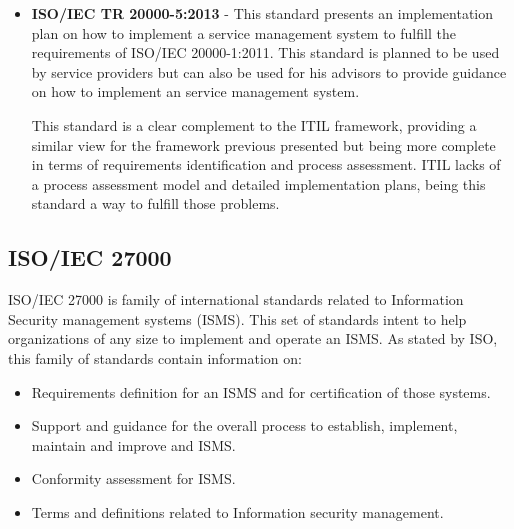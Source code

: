 \begin{itemize}
  \vspace{5mm}
  
  \item \textbf{ISO/IEC TR 20000-5:2013} - This standard presents an implementation plan on how to implement a service management system to fulfill the requirements of ISO/IEC 20000-1:2011. This standard is planned to be used by service providers but can also be used for his advisors to provide guidance on how to implement an service management system.\cite{ISO20000-5}\par
  
  \vspace{5mm}

  This standard is a clear complement to the ITIL framework, providing a similar view for the framework previous presented but being more complete in terms of requirements identification and process assessment. ITIL lacks of a process assessment model and detailed implementation plans, being this standard a way to fulfill those problems.\par
  
\end{itemize}

\subsection{ISO/IEC 27000}

ISO/IEC 27000 is family of international standards related to Information Security management systems (ISMS). This set of standards intent to help organizations of any size to implement and operate an ISMS. As stated by ISO, this family of standards contain information on:

\begin{itemize}

\item Requirements definition for an ISMS and for certification of those systems.
\item Support and guidance for the overall process to establish, implement, maintain and improve and ISMS.
\item Conformity assessment for ISMS.
\item Terms and definitions related to Information security management.

\end{itemize}


